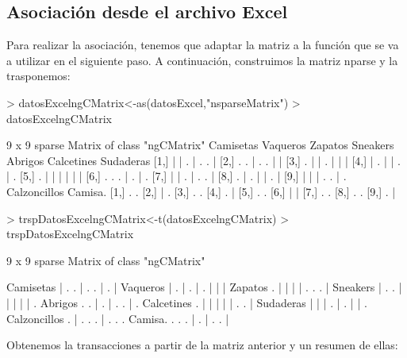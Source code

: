 \documentclass [a4paper] {article}
\begin{document}
\subsection{Asociación desde el archivo Excel}
Para realizar la asociación, tenemos que adaptar la matriz a la función
que se va a utilizar en el siguiente paso. A continuación, construimos la matriz nparse
y la trasponemos:

\begin{Schunk}
\begin{Sinput}
> datosExcelngCMatrix<-as(datosExcel,"nsparseMatrix")
> datosExcelngCMatrix
\end{Sinput}
\begin{Soutput}
9 x 9 sparse Matrix of class "ngCMatrix"
      Camisetas Vaqueros Zapatos Sneakers Abrigos Calcetines Sudaderas
 [1,]         |        |       .        |       .          .         |
 [2,]         .        .       |        .       .          |         |
 [3,]         .        |       |        .       |          |         |
 [4,]         |        .       |        |       .          |         .
 [5,]         .        |       |        |       |          |         |
 [6,]         .        .       .        |       .          |         .
 [7,]         |        |       .        |       .          .         |
 [8,]         .        |       .        |       |          .         |
 [9,]         |        |       |        .       .          |         .
      Calzoncillos Camisa.
 [1,]            .       .
 [2,]            |       .
 [3,]            .       .
 [4,]            .       |
 [5,]            .       .
 [6,]            |       |
 [7,]            .       .
 [8,]            .       .
 [9,]            .       |
\end{Soutput}
\begin{Sinput}
> trspDatosExcelngCMatrix<-t(datosExcelngCMatrix)
> trspDatosExcelngCMatrix
\end{Sinput}
\begin{Soutput}
9 x 9 sparse Matrix of class "ngCMatrix"
                              
Camisetas    | . . | . . | . |
Vaqueros     | . | . | . | | |
Zapatos      . | | | | . . . |
Sneakers     | . . | | | | | .
Abrigos      . . | . | . . | .
Calcetines   . | | | | | . . |
Sudaderas    | | | . | . | | .
Calzoncillos . | . . . | . . .
Camisa.      . . . | . | . . |
\end{Soutput}
\end{Schunk}

Obtenemos la transacciones a partir de la matriz anterior y un resumen de ellas:
\end{document}
